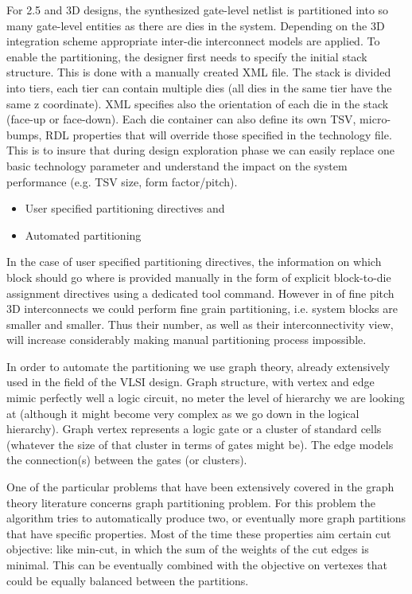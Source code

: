 For 2.5 and 3D designs, the synthesized gate-level netlist is partitioned into so many gate-level entities as there are dies in the system. Depending on the 3D integration scheme appropriate inter-die interconnect models are applied. To enable the partitioning, the designer first needs to specify the initial stack structure. This is done with a manually created XML file. The stack is divided into tiers, each tier can contain multiple dies (all dies in the same tier have the same z coordinate). XML specifies also the orientation of each die in the stack (face-up or face-down). Each die container can also define its own TSV, micro-bumps, RDL properties that will override those specified in the technology file. This is to insure that during design exploration phase we can easily replace one basic technology parameter and understand the impact on the system performance (e.g. TSV size, form factor/pitch).

\begin{itemize}
\item User specified partitioning directives and
\item Automated partitioning 
\end{itemize}

In the case of user specified partitioning directives, the information on which block should go where is provided manually in the form of explicit block-to-die assignment directives using a dedicated tool command. However in of fine pitch 3D interconnects we could perform fine grain partitioning, i.e. system blocks are smaller and smaller. Thus their number, as well as their interconnectivity view, will increase considerably making manual partitioning process impossible.

In order to automate the partitioning we use graph theory, already extensively used in the field of the VLSI design. Graph structure, with vertex and edge mimic perfectly well a logic circuit, no meter the level of hierarchy we are looking at (although it might become very complex as we go down in the logical hierarchy). Graph vertex represents a logic gate or a cluster of standard cells (whatever the size of that cluster in terms of gates might be). The edge models the connection(s) between the gates (or clusters).

One of the particular problems that have been extensively covered in the graph theory literature concerns graph partitioning problem. For this problem the algorithm tries to automatically produce two, or eventually more graph partitions that have specific properties. Most of the time these properties aim certain cut objective: like min-cut, in which the sum of the weights of the cut edges is minimal. This can be eventually combined with the objective on vertexes that could be equally balanced between the partitions.

